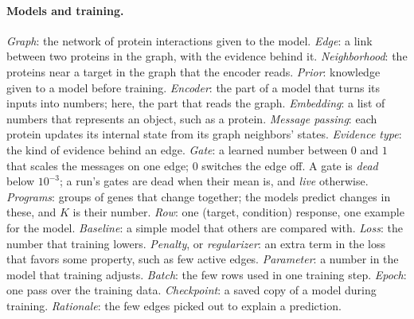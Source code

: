 \documentclass{article}
\begin{document}
\paragraph{Models and training.} \emph{Graph}: the network of protein interactions given to the model.
\emph{Edge}: a link between two proteins in the graph, with the evidence behind it. \emph{Neighborhood}: the
proteins near a target in the graph that the encoder reads. \emph{Prior}: knowledge given to a model before
training. \emph{Encoder}: the part of a model that turns its inputs into numbers; here, the part that reads
the graph. \emph{Embedding}: a list of numbers that represents an object, such as a protein. \emph{Message
passing}: each protein updates its internal state from its graph neighbors' states. \emph{Evidence type}:
the kind of evidence behind an edge. \emph{Gate}: a learned number between $0$ and $1$ that scales the
messages on one edge; $0$ switches the edge off. A gate is \emph{dead} below $10^{-3}$; a run's gates are
dead when their mean is, and \emph{live} otherwise. \emph{Programs}: groups of genes that change together; the models predict
changes in these, and $K$ is their number. \emph{Row}: one (target, condition) response, one example for
the model. \emph{Baseline}: a simple model that others are compared with. \emph{Loss}: the number that
training lowers. \emph{Penalty}, or \emph{regularizer}: an extra term in the loss that favors some
property, such as few active edges. \emph{Parameter}: a number in the model that training adjusts.
\emph{Batch}: the few rows used in one training step. \emph{Epoch}: one pass over the training data.
\emph{Checkpoint}: a saved copy of a model during training. \emph{Rationale}: the few edges picked out to
explain a prediction.
\end{document}
